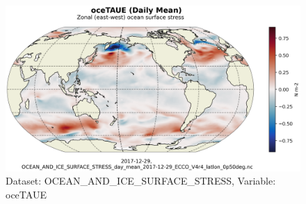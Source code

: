 \begin{figure}[H]
\centering
\includegraphics[scale=0.55]{../images/plots/latlon_plots/Ocean_and_Sea-Ice_Surface_Stress/oceTAUE.png}
\caption{Dataset: OCEAN\_AND\_ICE\_SURFACE\_STRESS, Variable: oceTAUE}
\label{tab:table-OCEAN_AND_ICE_SURFACE_STRESS_oceTAUE-Plot}
\end{figure}
\pagebreak
